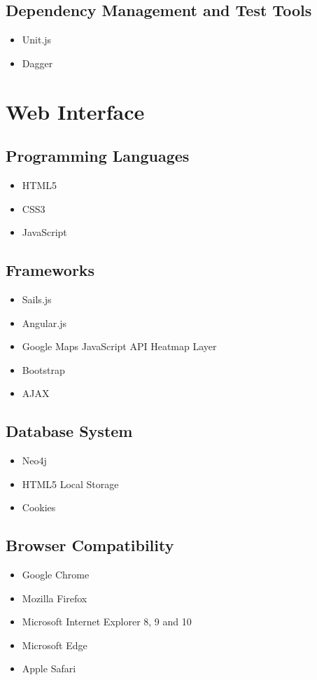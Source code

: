 \documentclass[11pt,fleqn]{book} %
\begin{document}
		\subsection{Dependency Management and Test Tools}
			\begin{itemize}
				\item Unit.js
				\item Dagger
			\end{itemize}
	\section{Web Interface}
		\subsection{Programming Languages}
			\begin{itemize}
				\item HTML5
				\item CSS3
				\item JavaScript
			\end{itemize}
		\subsection{Frameworks}
				\begin{itemize}
					\item Sails.js
					\item Angular.js
					\item Google Maps JavaScript API Heatmap Layer
					\item Bootstrap
					\item AJAX					
				\end{itemize}
		\subsection{Database System}
			\begin{itemize}
				\item Neo4j
				\item HTML5 Local Storage
				\item Cookies				
			\end{itemize}
		\subsection{Browser Compatibility}
			\begin{itemize}
				\item Google Chrome
				\item Mozilla Firefox
				\item Microsoft Internet Explorer 8, 9 and 10
				\item Microsoft Edge
				\item Apple Safari						
			\end{itemize}
\end{document}
